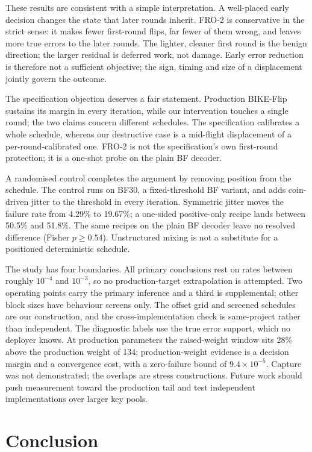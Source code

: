 \documentclass[runningheads,a4paper]{llncs}
\begin{document}
These results are consistent with a simple interpretation. A well-placed early decision changes the state that later rounds inherit. FRO-2 is conservative in the strict sense: it makes fewer first-round flips, far fewer of them wrong, and leaves more true errors to the later rounds. The lighter, cleaner first round is the benign direction; the larger residual is deferred work, not damage. Early error reduction is therefore not a sufficient objective; the sign, timing and size of a displacement jointly govern the outcome.

The specification objection deserves a fair statement. Production BIKE-Flip sustains its margin in every iteration, while our intervention touches a single round; the two claims concern different schedules. The specification calibrates a whole schedule, whereas our destructive case is a mid-flight displacement of a per-round-calibrated one. FRO-2 is not the specification's own first-round protection; it is a one-shot probe on the plain BF decoder.

A randomised control completes the argument by removing position from the schedule. The control runs on BF30, a fixed-threshold BF variant, and adds coin-driven jitter to the threshold in every iteration. Symmetric jitter moves the failure rate from 4.29\% to 19.67\%; a one-sided positive-only recipe lands between 50.5\% and 51.8\%. The same recipes on the plain BF decoder leave no resolved difference (Fisher $p\ge0.54$). Unstructured mixing is not a substitute for a positioned deterministic schedule.

The study has four boundaries. All primary conclusions rest on rates between roughly $10^{-4}$ and $10^{-3}$, so no production-target extrapolation is attempted. Two operating points carry the primary inference and a third is supplemental; other block sizes have behaviour screens only. The offset grid and screened schedules are our construction, and the cross-implementation check is same-project rather than independent. The diagnostic labels use the true error support, which no deployer knows. At production parameters the raised-weight window sits 28\% above the production weight of 134; production-weight evidence is a decision margin and a convergence cost, with a zero-failure bound of $9.4\times10^{-5}$. Capture was not demonstrated; the overlaps are stress constructions. Future work should push measurement toward the production tail and test independent implementations over larger key pools.

\section{Conclusion}\label{sec:conclusion}
\end{document}
